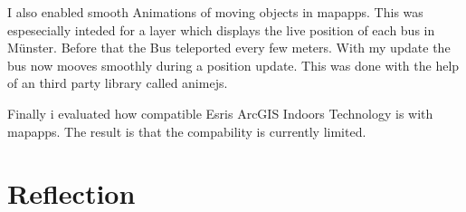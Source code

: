 \documentclass[11pt, titlepage, a4paper]{article}
\begin{document}
I also enabled smooth Animations of moving objects in mapapps. This was espesecially inteded for a layer which displays the live position of each bus in Münster. Before that the Bus teleported every few meters. With my update the bus now mooves smoothly during a position update. This was done with the help of an third party library called animejs. 

Finally i evaluated how compatible Esris ArcGIS Indoors Technology is with mapapps. The result is that the 
compability is currently limited. 
\section{Reflection}

\clearpage
\printglossary[type=\acronymtype]
\printglossary
\clearpage
\printbibliography
\end{document}
